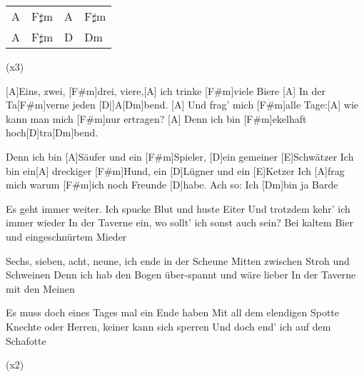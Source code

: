 

\begin{guitar}
	{\footnotesize\begin{tabular}{l|l|l|l}
			A & F$\sharp$m & A & F$\sharp$m \\
			A & F$\sharp$m & D & Dm
	\end{tabular}} (x3)
	
	[A]Eins, zwei, [F#m]drei, viere,[A] ich trinke [F#m]viele Biere
	[A] In der Ta[F#m]verne jeden [D|]A[Dm]bend.
	[A] Und frag' mich [F#m]alle Tage:[A] wie kann man mich [F#m]nur ertragen?
	[A] Denn ich bin [F#m]ekelhaft hoch[D]tra[Dm]bend.
	
	Denn ich bin [A]Säufer und ein [F#m]Spieler, [D]ein gemeiner [E]Schwätzer
	Ich bin ein[A] dreckiger [F#m]Hund, ein [D]Lügner und ein [E]Ketzer
	Ich [A]frag mich warum [F#m]ich noch Freunde [D]habe. Ach so: Ich [Dm]bin ja Barde
	
	Es geht immer weiter. Ich spucke Blut und huste Eiter
	Und trotzdem kehr' ich immer wieder
	In der Taverne ein, wo sollt' ich sonst auch sein?
	Bei kaltem Bier und eingeschnürtem Mieder
	
	 
	
	Sechs, sieben, acht, neune, ich ende in der Scheune
	Mitten zwischen Stroh und Schweinen
	Denn ich hab den Bogen über-spannt und wäre lieber
	In der Taverne mit den Meinen
	
	 
	
	Es muss doch eines Tages mal ein Ende haben
	Mit all dem elendigen Spotte
	Knechte oder Herren, keiner kann sich sperren
	Und doch end' ich auf dem Schafotte
	
	  (x2)

\end{guitar}